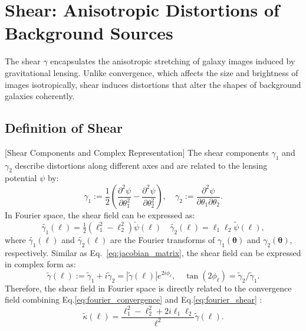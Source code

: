\section[Shear Field]{Shear: Anisotropic Distortions of Background Sources}
The shear $\gamma$ encapsulates the anisotropic stretching of galaxy images induced by gravitational lensing. Unlike convergence, which affects the size and brightness of images isotropically, shear induces distortions that alter the shapes of background galaxies coherently. 
\subsection{Definition of Shear}[Shear Components and Complex Representation]
The shear components $\gamma_1$ and $\gamma_2$ describe distortions along different axes and are related to the lensing potential $\psi$ by:
\begin{equation}
    \label{eq:physical_shear}
    \gamma_1 := \frac{1}{2} \left( \frac{\partial^2 \psi}{\partial \theta_1^2} - \frac{\partial^2 \psi}{\partial \theta_2^2} \right), \quad \gamma_2 := \frac{\partial^2 \psi}{\partial \theta_1 \partial \theta_2}.
\end{equation}
In Fourier space, the shear field can be expressed as:
\begin{equation}
    \label{eq:fourier_shear}
    \tilde{\gamma_1}(\boldsymbol{\ell}) = \tfrac{1}{2} \left( \ell_1^2 - \ell_2^2 \right) \tilde{\psi}(\boldsymbol{\ell}) \quad
    \tilde{\gamma_2}(\boldsymbol{\ell}) = \ell_1 \ell_2 \tilde{\psi}(\boldsymbol{\ell}) ,
\end{equation}
where $\tilde{\gamma_1}(\boldsymbol{\ell})$ and $\tilde{\gamma_2}(\boldsymbol{\ell})$ are the Fourier transforms of $\gamma_1(\boldsymbol{\theta})$ and $\gamma_2(\boldsymbol{\theta})$, respectively. 
Similar as Eq.~\eqref{eq:jacobian_matrix}, the shear field can be expressed in complex form as:
\begin{equation}
    \label{eq:fourier_shear1}
    \tilde{\gamma}(\boldsymbol{\ell}) := \tilde{\gamma}_1 + i\tilde{\gamma}_2 = |\tilde{\gamma}(\boldsymbol{\ell})|e^{2i\phi_\ell}, \quad \tan (2\phi_\ell) = \tilde{\gamma}_2 / \tilde{\gamma}_1.
\end{equation}
Therefore, the shear field in Fourier space is directly related to the convergence field combining Eq.\eqref{eq:fourier_convergence} and Eq.\eqref{eq:fourier_shear} \citep{1993ApJ...404..441K}:
\begin{equation}
    \tilde{\kappa}(\boldsymbol{\ell}) = \frac{\ell_1^2 - \ell_2^2 + 2i\ell_1\ell_2}{\ell^2} \tilde{\gamma}(\boldsymbol{\ell}).
    \label{eq:kappa_gamma_relation}
\end{equation}

